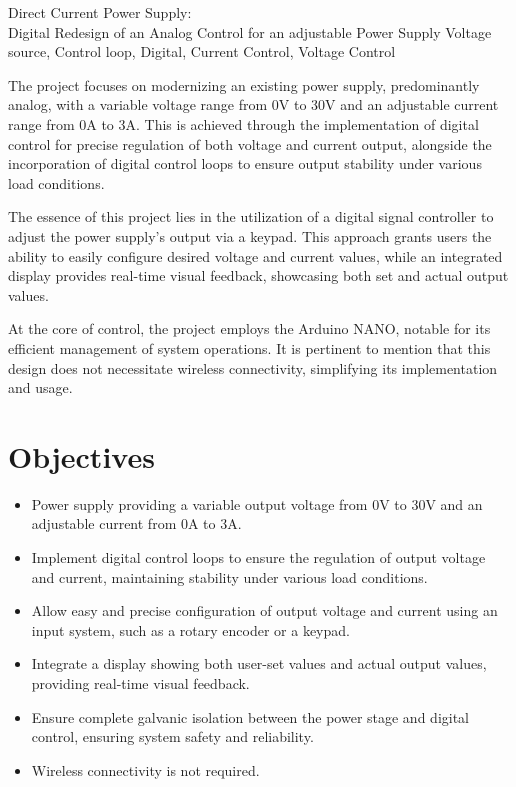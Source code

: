 
\begin{theabstract} {Direct Current Power Supply:\\Digital Redesign of an Analog Control for an adjustable Power Supply} {Voltage source, Control loop, Digital, Current Control, Voltage Control}

The project focuses on modernizing an existing power supply, predominantly analog, with a variable voltage range from 0V to 30V and an adjustable current range from 0A to 3A. This is achieved through the implementation of digital control for precise regulation of both voltage and current output, alongside the incorporation of digital control loops to ensure output stability under various load conditions.

The essence of this project lies in the utilization of a digital signal controller to adjust the power supply's output via a keypad. This approach grants users the ability to easily configure desired voltage and current values, while an integrated display provides real-time visual feedback, showcasing both set and actual output values.

At the core of control, the project employs the Arduino NANO, notable for its efficient management of system operations. It is pertinent to mention that this design does not necessitate wireless connectivity, simplifying its implementation and usage.

\section*{Objectives}

\begin{itemize}
    \item Power supply providing a variable output voltage from 0V to 30V and an adjustable current from 0A to 3A.
    \item Implement digital control loops to ensure the regulation of output voltage and current, maintaining stability under various load conditions.
    \item Allow easy and precise configuration of output voltage and current using an input system, such as a rotary encoder or a keypad.
    \item Integrate a display showing both user-set values and actual output values, providing real-time visual feedback.
    \item Ensure complete galvanic isolation between the power stage and digital control, ensuring system safety and reliability.
    \item Wireless connectivity is not required.
\end{itemize}

\end{theabstract}

